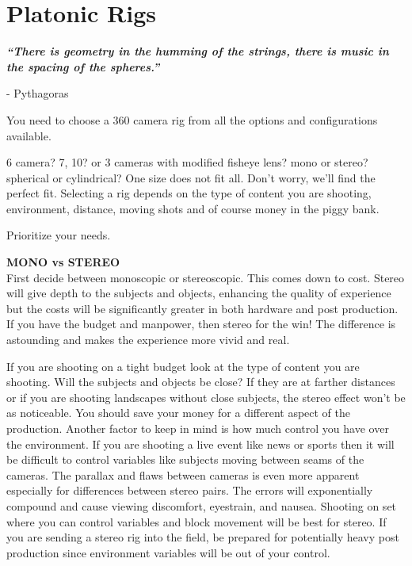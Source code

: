 \chapter{ Platonic Rigs}
\pagecolor{white}
\label{chap:2}
\begin{fullwidth}

{\itshape\bfseries “There is geometry in the humming of the strings, there is music in the spacing of the spheres.”}

- Pythagoras
\vspace{\baselineskip}

\problem

{\large You need to choose a 360 camera rig from all the options and configurations available.
 \par}

6 camera? 7, 10? or 3 cameras with modified fisheye lens? mono or stereo? spherical or cylindrical? One size does not fit all. Don’t worry, we’ll find the perfect fit. Selecting a rig depends on the type of content you are shooting, environment, distance, moving shots and of course money in the piggy bank.

\solution

{\large Prioritize your needs.
 \par}

{\bfseries MONO vs STEREO}
\\
First decide between monoscopic or stereoscopic. This comes down to cost. Stereo will give depth to the subjects and objects, enhancing the quality of experience but the costs will be significantly greater in both hardware and post production. If you have the budget and manpower, then stereo for the win! The difference is astounding and makes the experience more vivid and real. 

If you are shooting on a tight budget look at the type of content you are shooting. Will the subjects and objects be close? If they are at farther distances or if you are shooting landscapes without close subjects, the stereo effect won’t be as noticeable. You should save your money for a different aspect of the production. Another factor to keep in mind is how much control you have over the environment. If you are shooting a live event like news or sports then it will be difficult to control variables like subjects moving between seams of the cameras. The parallax and flaws between cameras is even more apparent especially for differences between stereo pairs. The errors will exponentially compound and cause viewing discomfort, eyestrain, and nausea. Shooting on set where you can control variables and block movement will be best for stereo. If you are sending a stereo rig into the field, be prepared for potentially heavy post production since environment variables will be out of your control. 


\end{fullwidth}
